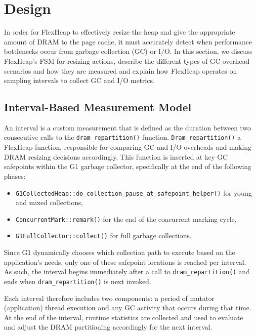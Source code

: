 \section{Design}

In order for FlexHeap to effectively resize 
the heap and give the appropriate amount of DRAM to the page 
cache, it must accurately detect when performance bottlenecks occur
from garbage collection (GC) or I/O. 
In this section, we discuss FlexHeap's FSM for resizing actions,
describe the different types of GC overhead scenarios and how they 
are measured and explain how FlexHeap operates on sampling intervals to collect GC and I/O metrics.
\subsection{Interval-Based Measurement Model}

An interval is a custom measurement that is defined as the duration between two consecutive calls to the \texttt{dram\_repartition()} function.
\texttt{Dram\_repartition()} a FlexHeap function, responsible for comparing GC and I/O overheads
and making DRAM resizing decisions accordingly. 
This function is inserted at key GC safepoints within the G1 garbage collector, specifically at the end of the following phases: 

\begin{itemize}
  \item \texttt{G1CollectedHeap::do\allowbreak\_collection\allowbreak\_pause\allowbreak\_at\allowbreak\_safepoint\allowbreak\_helper()} for young and mixed collections,
  \item \texttt{ConcurrentMark::remark()} for the end of the concurrent marking cycle,
  \item \texttt{G1FullCollector::collect()} for full garbage collections.
\end{itemize}

Since G1 dynamically chooses which collection path to execute based on the application's needs, only one of these safepoint 
locations is reached per interval. As such, the interval begins immediately after a call to \texttt{dram\_repartition()} 
and ends when \texttt{dram\_repartition()} is next invoked.

Each interval therefore includes two components: a period of mutator (application) thread execution 
and any GC activity that occurs during that time. At the end of the interval, runtime statistics are 
collected and used to evaluate and adjust the 
DRAM partitioning accordingly for the next interval.


